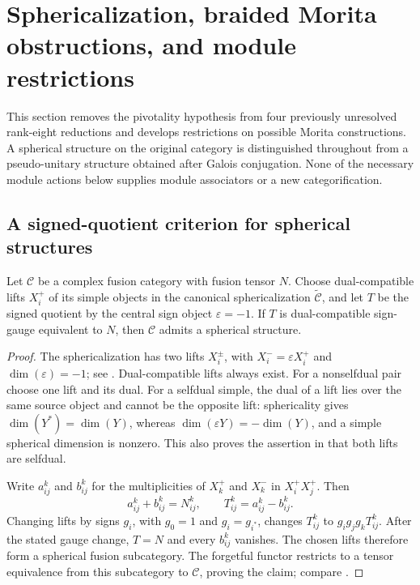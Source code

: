 \section{Sphericalization, braided Morita obstructions, and module restrictions}
\label{sec:m3-research-20261022}

This section removes the pivotality hypothesis from four previously unresolved
rank-eight reductions and develops restrictions on possible Morita
constructions.  A spherical structure on the original category is
distinguished throughout from a pseudo-unitary structure obtained after
Galois conjugation.  None of the necessary module actions below supplies
module associators or a new categorification.

\subsection{A signed-quotient criterion for spherical structures}
\label{subsec:research-signed-section}

\begin{lemma}
\label{lem:research-spherical-section}
Let $\mathcal C$ be a complex fusion category with fusion tensor $N$.
Choose dual-compatible lifts $X_i^+$ of its simple objects in the canonical
sphericalization $\widetilde{\mathcal C}$, and let $T$ be the signed
quotient by the central sign object $\varepsilon=-1$.  If $T$ is
dual-compatible sign-gauge equivalent to $N$, then $\mathcal C$ admits a
spherical structure.
\end{lemma}
\begin{proof}
The sphericalization has two lifts $X_i^\pm$, with
$X_i^-=\varepsilon X_i^+$ and $\dim(\varepsilon)=-1$; see
\cite[Section~5.1]{OstrikPiv3}.  Dual-compatible lifts always exist.
For a nonselfdual pair choose one lift and its dual.  For a selfdual
simple, the dual of a lift lies over the same source object and cannot
be the opposite lift: sphericality gives $\dim(Y^*)=\dim(Y)$, whereas
$\dim(\varepsilon Y)=-\dim(Y)$, and a simple spherical dimension is
nonzero.  This also proves the assertion in
\cite[Section~5.1(a)]{OstrikPiv3} that both lifts are selfdual.

Write $a_{ij}^k$ and $b_{ij}^k$ for the multiplicities of $X_k^+$ and
$X_k^-$ in $X_i^+X_j^+$.  Then
\[
 a_{ij}^k+b_{ij}^k=N_{ij}^k,\qquad
 T_{ij}^k=a_{ij}^k-b_{ij}^k.
\]
Changing lifts by signs $g_i$, with $g_0=1$ and $g_i=g_{i^*}$,
changes $T_{ij}^k$ to $g_i g_j g_kT_{ij}^k$.
After the stated gauge change, $T=N$ and every $b_{ij}^k$ vanishes.
The chosen lifts therefore form a spherical fusion subcategory.  The
forgetful functor restricts to a tensor equivalence from this subcategory
to $\mathcal C$, proving the claim; compare
\cite[Section~5.1(c)]{OstrikPiv3}.
\end{proof}

